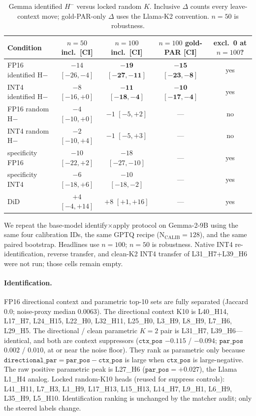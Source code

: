 \documentclass{article} %
\begin{document}
\begin{table}[ht]
\caption{Gemma identified $H^{-}$ versus locked random $K$. Inclusive $\Delta$ counts every leave-context move; gold-PAR-only $\Delta$ uses the Llama-K2 convention. $n{=}50$ is robustness.}
\label{tab:gemma-hminus-n50-n100}
\centering
\footnotesize
\setlength{\tabcolsep}{2pt}
\begin{tabular}{lcccc}
\toprule
Condition & $n{=}50$ incl.\ [CI] & $n{=}100$ incl.\ [CI] & $n{=}100$ gold-PAR [CI] & excl.\ 0 at $n{=}100$? \\
\midrule
FP16 identified H$-$ & $-14$ $[-26,-4]$ & $\mathbf{-19}$ $\mathbf{[-27,-11]}$ & $\mathbf{-15}$ $\mathbf{[-23,-8]}$ & yes \\
INT4 identified H$-$ & $-8$ $[-16,+0]$ & $\mathbf{-11}$ $\mathbf{[-18,-4]}$ & $\mathbf{-10}$ $\mathbf{[-17,-4]}$ & yes \\
FP16 random H$-$ & $-4$ $[-10,+0]$ & $-1$ $[-5,+2]$ & --- & no \\
INT4 random H$-$ & $-2$ $[-10,+4]$ & $-1$ $[-5,+3]$ & --- & no \\
specificity FP16 & $-10$ $[-22,+2]$ & $-18$ $[-27,-10]$ & --- & yes \\
specificity INT4 & $-6$ $[-18,+6]$ & $-10$ $[-18,-2]$ & --- & yes \\
DiD & $+4$ $[-4,+14]$ & $+8$ $[+1,+16]$ & --- & yes \\
\bottomrule
\end{tabular}
\end{table}

We repeat the base-model identify$\times$apply protocol on Gemma-2-9B using the same four calibration IDs, the same GPTQ recipe ($\mathrm{N_{CALIB}{=}128}$), and the same paired bootstrap. Headlines use $n{=}100$; $n{=}50$ is robustness. Native INT4 re-identification, reverse transfer, and clean-K2 INT4 transfer of L31\_H7+L39\_H6 were not run; those cells remain empty.

\paragraph{Identification.}
FP16 directional context and parametric top-10 sets are fully separated (Jaccard $0.0$; noise-proxy median $0.0063$). The directional context K10 is L40\_H14, L17\_H7, L24\_H15, L22\_H0, L32\_H11, L25\_H0, L3\_H9, L8\_H9, L7\_H6, L29\_H5. The directional / clean parametric $K{=}2$ pair is L31\_H7, L39\_H6---identical, and both are context suppressors ($\texttt{ctx\_pos}$ $-0.115$ / $-0.094$; $\texttt{par\_pos}$ $0.002$ / $0.010$, at or near the noise floor). They rank as parametric only because $\texttt{directional\_par} = \texttt{par\_pos} - \texttt{ctx\_pos}$ is large when $\texttt{ctx\_pos}$ is large-negative. The raw positive parametric peak is L27\_H6 ($\texttt{par\_pos}{=}+0.027$), the Llama L1\_H4 analog. Locked random-K10 heads (reused for suppress controls): L41\_H11, L7\_H3, L1\_H9, L17\_H13, L15\_H13, L14\_H7, L9\_H1, L6\_H9, L35\_H9, L5\_H10. Identification ranking is unchanged by the matcher audit; only the steered labels change.
\end{document}
